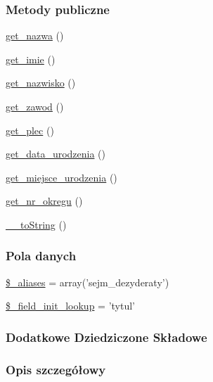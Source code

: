 \subsubsection*{Metody publiczne}
\begin{DoxyCompactItemize}
\item 
\hyperlink{classep___sejm___dezyderat_ac0818f0049d7b84f08f77128f54cee36}{get\-\_\-nazwa} ()
\item 
\hyperlink{classep___sejm___dezyderat_ac4b0c85dc2a130038f2d118dbd0c3d77}{get\-\_\-imie} ()
\item 
\hyperlink{classep___sejm___dezyderat_abdd1d7ff92508da7f748ba1feec97af0}{get\-\_\-nazwisko} ()
\item 
\hyperlink{classep___sejm___dezyderat_af80ca8310b60004454dd02a387deaa2c}{get\-\_\-zawod} ()
\item 
\hyperlink{classep___sejm___dezyderat_ac7f9af5c3fa024e4c26a7b6bd4ce4bb4}{get\-\_\-plec} ()
\item 
\hyperlink{classep___sejm___dezyderat_a880b240cd2d8c336fd1709bf0cb1ae2c}{get\-\_\-data\-\_\-urodzenia} ()
\item 
\hyperlink{classep___sejm___dezyderat_ac57c08ec5e394a19c5bd9280c8376182}{get\-\_\-miejsce\-\_\-urodzenia} ()
\item 
\hyperlink{classep___sejm___dezyderat_a2645a9f0aa5b0ccc482943348c033d0a}{get\-\_\-nr\-\_\-okregu} ()
\item 
\hyperlink{classep___sejm___dezyderat_a7516ca30af0db3cdbf9a7739b48ce91d}{\-\_\-\-\_\-to\-String} ()
\end{DoxyCompactItemize}
\subsubsection*{Pola danych}
\begin{DoxyCompactItemize}
\item 
\hyperlink{classep___sejm___dezyderat_ab4e31d75f0bc5d512456911e5d01366b}{\$\-\_\-aliases} = array('sejm\-\_\-dezyderaty')
\item 
\hyperlink{classep___sejm___dezyderat_a4a4d54ae35428077a7c61ec8a5139af3}{\$\-\_\-field\-\_\-init\-\_\-lookup} = 'tytul'
\end{DoxyCompactItemize}
\subsubsection*{Dodatkowe Dziedziczone Składowe}


\subsubsection{Opis szczegółowy}


